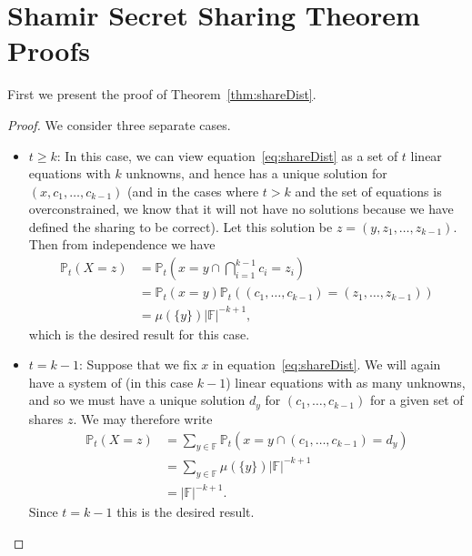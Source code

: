 \documentclass{article}
\theoremstyle{remark}
\newcommand{\F}{\mathbb{F}}
\renewcommand{\P}{\mathbb{P}}
\begin{document}
\section{Shamir Secret Sharing Theorem Proofs}\label{app:shamir}

First we present the proof of Theorem~\ref{thm:shareDist}.
\begin{proof}
	We consider three separate cases.
	\begin{itemize}
		\item $t \ge k$: In this case, we can view
			equation~\eqref{eq:shareDist} as a set of $t$ linear equations with
			$k$ unknowns, and hence has a unique solution for $(x, c_1, \ldots,
			c_{k-1})$ (and in the cases where $t > k$ and the set of equations
			is overconstrained, we know that it will not have no solutions
			because we have defined the sharing to be correct). Let this
			solution be $z = (y, z_1, \ldots, z_{k-1})$. Then from independence
			we have
			\begin{align*}
				\P_t(X = z) &=
				\P_t\left(
					x = y \cap \bigcap_{i = 1}^{k-1} c_i = z_i
				\right)\\
				&= \P_t(x = y)
				\P_t((c_1, \ldots, c_{k-1}) = (z_1, \ldots, z_{k-1}))\\
				&= \mu(\{y\})|\F|^{-k+1},
			\end{align*}
			which is the desired result for this case.

		\item $t = k - 1$: Suppose that we fix $x$ in
			equation~\eqref{eq:shareDist}. We will again have a system of (in
			this case $k-1$) linear equations with as many unknowns, and so we
			must have a unique solution $d_y$ for $(c_1, \ldots, c_{k-1})$ for
			a given set of shares $z$. We may therefore write
			\begin{align*}
				\P_t(X = z) &=
				\sum_{y \in \F}
				\P_t(x = y \cap (c_1, \ldots, c_{k-1}) = d_y)\\
				&= \sum_{y \in \F} \mu(\{y\})|\F|^{-k+1}\\
				&= |\F|^{-k+1}.
			\end{align*}
			Since $t = k - 1$ this is the desired result.


\end{itemize}
\end{proof}
\end{document}
